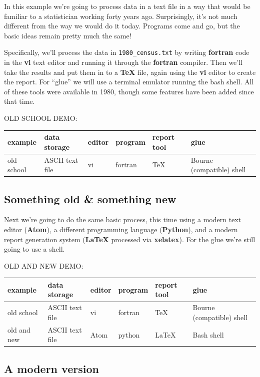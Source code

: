 \documentclass[
]{book}
\begin{document}
In this example we're going to process data in a text file in a way that would be familiar to a statistician working forty years ago. Surprisingly, it's not much different from the way we would do it today. Programs come and go, but the basic ideas remain pretty much the same!

Specifically, we'll process the data in \texttt{1980\_census.txt} by writing \textbf{fortran} code in the \textbf{vi} text editor and running it through the \textbf{fortran} compiler. Then we'll take the results and put them in to a \textbf{TeX} file, again using the \textbf{vi} editor to create the report. For ``glue'' we will use a terminal emulator running the bash shell. All of these tools were available in 1980, though some features have been added since that time.

OLD SCHOOL DEMO:

\begin{longtable}[]{@{}llllll@{}}
\toprule
example & data storage & editor & program & report tool & glue\tabularnewline
\midrule
\endhead
old school & ASCII text file & vi & fortran & TeX & Bourne (compatible) shell\tabularnewline
\bottomrule
\end{longtable}

\hypertarget{something-old-something-new}{%
\subsection{Something old \& something new}\label{something-old-something-new}}

Next we're going to do the same basic process, this time using a modern text editor (\textbf{Atom}), a different programming language (\textbf{Python}), and a modern report generation system (\textbf{LaTeX} processed via \textbf{xelatex}). For the glue we're still going to use a shell.

OLD AND NEW DEMO:

\begin{longtable}[]{@{}llllll@{}}
\toprule
example & data storage & editor & program & report tool & glue\tabularnewline
\midrule
\endhead
old school & ASCII text file & vi & fortran & TeX & Bourne (compatible) shell\tabularnewline
old and new & ASCII text file & Atom & python & LaTeX & Bash shell\tabularnewline
\bottomrule
\end{longtable}

\hypertarget{a-modern-version}{%
\subsection{A modern version}\label{a-modern-version}}
\end{document}
